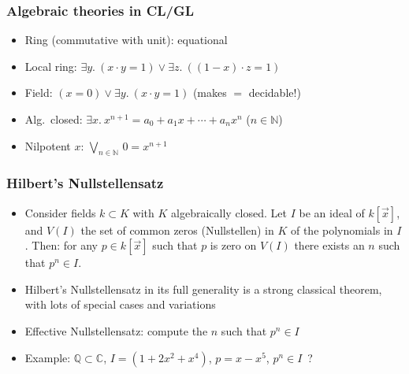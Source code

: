 \documentclass[handout,11pt]{beamer}
\newcommand{\nat}{\mathbb{N}}
\begin{document}
\begin{frame}
\frametitle{Algebraic theories in CL/GL}
 \begin{itemize}[<+->]   %
    \item Ring (commutative with unit): equational
    \item Local ring: $%
    \exists y.~(x\cdot y=1) \lor \exists z.~((1-x)\cdot z = 1)$
    \item Field: $%
    (x=0) \lor \exists y.~(x\cdot y=1)$ (makes $=$ decidable!)
    \item Alg.\ closed: $%
    \exists x.~x^{n+1}=a_0 + a_1 x + \cdots + a_n x^n $ ($n\in\nat$)
    \item Nilpotent $x$: $\bigvee_{n\in\nat}\, 0= x^{n+1}$

 \end{itemize}
\end{frame}

\begin{frame}
\frametitle{Hilbert's Nullstellensatz}
 \begin{itemize}[<+->]   %
    \item Consider fields $k \subset K$ with $K$ algebraically closed.
    Let $I$ be an ideal of $k[\vec x]$, and $V(I)$ the set of common zeros (Nullstellen)
    in $K$ of the polynomials in $I$. Then: for any $p\in k[\vec x]$ such that
    $p$ is zero on $V(I)$ there exists an $n$ such that $p^n \in I$.
    \item Hilbert's Nullstellensatz in its full generality is a strong classical theorem,
    with lots of special cases and variations
    \item Effective Nullstellensatz: \alert{compute} the $n$ such that $p^n \in I$
    \item Example: 
  $\mathbb{Q} \subset \mathbb{C}$, $I=(1+2x^2+x^4)$, $p= x-x^5$, $p^n \in I$~?

 \end{itemize}
\end{frame}
\end{document}
